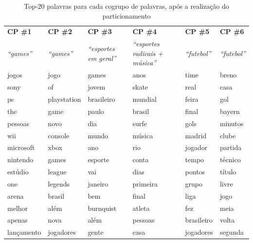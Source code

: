\documentclass[
    12pt,                %
    oneside,            %
    a4paper,            %
    english,            %
    brazil                %
    ]{abntex2ppgsi}
\begin{document}
\begin{table}
    \begin{table}[H]
    \centering
        \caption{Top-$20$ palavras para cada cogrupo de palavras, após a realização do particionamento}
        \begin{tabular}{llllll}
            \hline
            \textbf{CP \#1} & \textbf{CP \#2} & \textbf{CP \#3} & \textbf{CP \#4} & \textbf{CP \#5} & \textbf{CP \#6} \\
            \textit{``games''} & \textit{``games''} & \textit{``esportes em geral''} & \textit{``esportes radicais + música''} & \textit{``futebol''} & \textit{``futebol''} \\
            \hline
            jogos      & jogo               & games      & anos              & time       & breno  \\
            sony       & of                 & jovem      & skate             & real       & casa  \\
            ps         & playstation        & brasileiro & mundial           & feira      & gol  \\
            the        & game               & paulo      & brasil            & final      & bayern  \\
            pessoas    & novo               & dia        & surfe             & gols       & minutos  \\
            wii        & console            & mundo      & música            & madrid     & clube  \\
            microsoft  & xbox               & ano        & rio               & jogador    & partida  \\
            nintendo   & games              & esporte    & conta             & tempo      & técnico  \\
            estúdio    & league             & vai        & dias              & pontos     & título  \\
            one        & legends            & janeiro    & primeira          & grupo      & livre  \\
            arena      & brasil             & bem        & final             & liga       & jogo  \\
            melhor     & além               & burnquist  & atleta            & fez        & meia  \\
            apenas     & nova               & além       & pessoas           & brasileiro & volta  \\
            lançamento & jogadores          & gente      & casa              & jogadores  & segunda  \\

\end{tabular}
\end{table}
\end{table}
\end{document}
